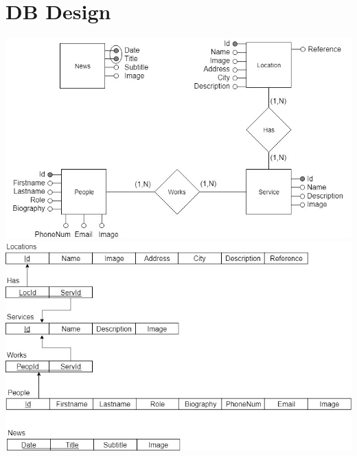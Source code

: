 %
%
\chapter{DB Design}
%
%
\includegraphics[scale=0.5]{MainMatter/ER.jpg}
\newpage
\includegraphics[scale=0.6]{MainMatter/DB.jpg}
%
%
